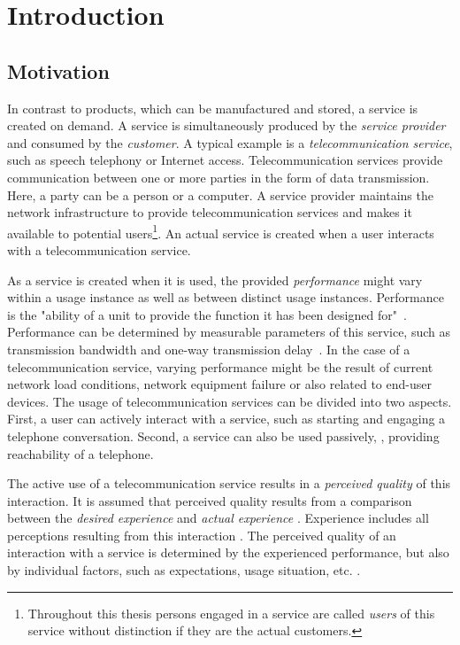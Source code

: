 \chapter{Introduction}\label{chap:01}

\section{Motivation}
In contrast to products, which can be manufactured and stored, a service is created on demand.
A service is simultaneously produced by the \emph{service provider} and consumed by the \emph{customer}.
A typical example is a \emph{telecommunication service}, such as speech telephony or Internet access.
Telecommunication services provide communication between one or more parties in the form of data transmission.
Here, a party can be a person or a computer.
A service provider maintains the network infrastructure to provide telecommunication services and makes it available to potential users\footnote{Throughout this thesis persons engaged in a service are called \emph{users} of this service without distinction if they are the actual customers.}.
An actual service is created when a user interacts with a telecommunication service.

As a service is created when it is used, the provided \emph{performance} might vary within a usage instance as well as between distinct usage instances.
Performance is the "ability of a unit to provide the function it has been designed for"~\citep[][p.\,360]{moller_quality_2005}.
Performance can be determined by measurable parameters of this service, such as transmission bandwidth and one-way transmission delay~\citep[][p.\,12]{moller_assessment_2000}.
In the case of a telecommunication service, varying performance might be the result of current network load conditions, network equipment failure or also related to end-user devices.
The usage of telecommunication services can be divided into two aspects.
First, a user can actively interact with a service, such as starting and engaging a telephone conversation.
Second, a service can also be used passively, \eg, providing reachability of a telephone.

The active use of a telecommunication service results in a \emph{perceived quality} of this interaction.
It is assumed that perceived quality results from a comparison between the \emph{desired experience} and \emph{actual experience} \citep[][p.\,13]{raake_quality_2014}. %
Experience includes all perceptions resulting from this interaction \citep[][p.\,13]{raake_quality_2014}.
The perceived quality of an interaction with a service is determined by the experienced performance, but also by individual factors, such as expectations, usage situation, etc. \citep[\eg,][p.\,55ff.]{reiter_factors_2014}.

